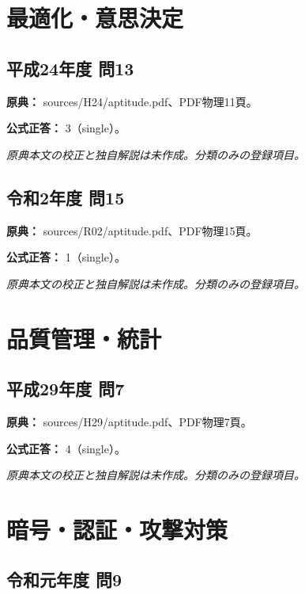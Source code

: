 \section{最適化・意思決定}

\subsection{平成24年度 問13}
\label{q:h24-reg-apt-13}

\noindent\textbf{原典：} sources/H24/aptitude.pdf、PDF物理11頁。

\textbf{公式正答：} 3（single）。

\par\textit{原典本文の校正と独自解説は未作成。分類のみの登録項目。}

\subsection{令和2年度 問15}
\label{q:r02-reg-apt-15}

\noindent\textbf{原典：} sources/R02/aptitude.pdf、PDF物理15頁。

\textbf{公式正答：} 1（single）。

\par\textit{原典本文の校正と独自解説は未作成。分類のみの登録項目。}

\section{品質管理・統計}

\subsection{平成29年度 問7}
\label{q:h29-reg-apt-07}

\noindent\textbf{原典：} sources/H29/aptitude.pdf、PDF物理7頁。

\textbf{公式正答：} 4（single）。

\par\textit{原典本文の校正と独自解説は未作成。分類のみの登録項目。}

\section{暗号・認証・攻撃対策}

\subsection{令和元年度 問9}
\label{q:r01-reg-apt-09}


